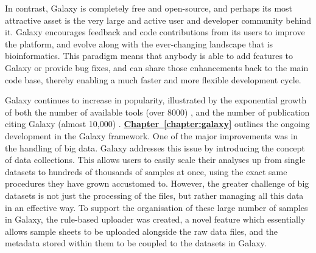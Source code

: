 In contrast, Galaxy is completely free and open-source, and perhaps its most attractive asset is the very large and active user and developer community behind it. Galaxy encourages feedback and code contributions from its users to improve the platform, and evolve along with the ever-changing landscape that is bioinformatics. This paradigm means that anybody is able to add features to Galaxy or provide bug fixes, and can share those enhancements back to the main code base, thereby enabling a much faster and more flexible development cycle.

Galaxy continues to increase in popularity, illustrated by the exponential growth of both the number of available tools (over 8000) \cite{galaxytoolshed}, and the number of publication citing Galaxy (almost 10,000) \cite{url-zotero-galaxy}.
\hyperref[chapter:galaxy]{\textbf{Chapter~\ref{chapter:galaxy}}} outlines the ongoing development in the Galaxy framework. One of the major improvements was in the handling of big data. Galaxy addresses this issue by introducing the concept of data collections. This allows users to easily scale their analyses up from single datasets to hundreds of thousands of samples at once, using the exact same procedures they have grown accustomed to.
However, the greater challenge of big datasets is not just the processing of the files, but rather managing all this data in an effective way.
To support the organisation of these large number of samples in Galaxy, the rule-based uploader was created, a novel feature which essentially allows sample sheets to be uploaded alongside the raw data files, and the metadata stored within them to be coupled to the datasets in Galaxy.

